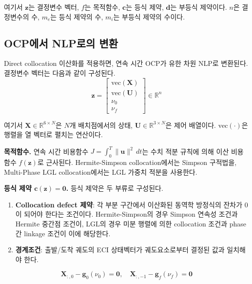 \documentclass[11pt]{article}
\begin{document}
여기서 $\mathbf{z}$는 결정변수 벡터, $f$는 목적함수, $\mathbf{c}$는 등식 제약, $\mathbf{d}$는 부등식 제약이다. $n$은 결정변수의 수, $m_e$는 등식 제약의 수, $m_i$는 부등식 제약의 수이다.

\subsection{OCP에서 NLP로의 변환}

Direct collocation 이산화를 적용하면, 연속 시간 OCP가 유한 차원 NLP로 변환된다. 결정변수 벡터는 다음과 같이 구성된다.
%
\begin{equation}\label{eq:decision-vec}
\mathbf{z} = \begin{bmatrix} \text{vec}(\mathbf{X}) \\ \text{vec}(\mathbf{U}) \\ \nu_0 \\ \nu_f \end{bmatrix} \in \mathbb{R}^n
\end{equation}

여기서 $\mathbf{X} \in \mathbb{R}^{6 \times N}$은 $N$개 배치점에서의 상태, $\mathbf{U} \in \mathbb{R}^{3 \times N}$은 제어 배열이다. $\text{vec}(\cdot)$은 행렬을 열 벡터로 펼치는 연산이다.

\textbf{목적함수.} 연속 시간 비용함수 $J = \int_0^T \|\mathbf{u}\|^2\, dt$는 수치 적분 규칙에 의해 이산 비용함수 $f(\mathbf{z})$로 근사된다. Hermite-Simpson collocation에서는 Simpson 구적법을, Multi-Phase LGL collocation에서는 LGL 가중치 적분을 사용한다.

\textbf{등식 제약 $\mathbf{c}(\mathbf{z}) = \mathbf{0}$.} 등식 제약은 두 부류로 구성된다.

\begin{enumerate}[leftmargin=*]
  \item \textbf{Collocation defect 제약}: 각 부분 구간에서 이산화된 동역학 방정식의 잔차가 0이 되어야 한다는 조건이다. Hermite-Simpson의 경우 Simpson 연속성 조건과 Hermite 중간점 조건이, LGL의 경우 미분 행렬에 의한 collocation 조건과 phase간 linkage 조건이 이에 해당한다.

  \item \textbf{경계조건}: 출발/도착 궤도의 ECI 상태벡터가 궤도요소로부터 결정된 값과 일치해야 한다.
\end{enumerate}
%
\begin{equation}\label{eq:bc-constraint}
\mathbf{X}_{:,0} - \mathbf{g}_0(\nu_0) = \mathbf{0}, \quad \mathbf{X}_{:,-1} - \mathbf{g}_f(\nu_f) = \mathbf{0}
\end{equation}
\end{document}
